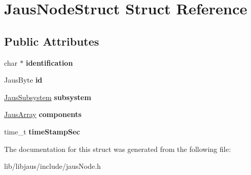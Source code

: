 \hypertarget{struct_jaus_node_struct}{\section{\-Jaus\-Node\-Struct \-Struct \-Reference}
\label{struct_jaus_node_struct}
}
\subsection*{\-Public \-Attributes}
\begin{DoxyCompactItemize}
\item 
\hypertarget{struct_jaus_node_struct_a1bf21d01cc46617f3c91c2bb69a3215b}{char $\ast$ {\bfseries identification}}\label{struct_jaus_node_struct_a1bf21d01cc46617f3c91c2bb69a3215b}

\item 
\hypertarget{struct_jaus_node_struct_a47acd907637669325792e99367c2e308}{\-Jaus\-Byte {\bfseries id}}\label{struct_jaus_node_struct_a47acd907637669325792e99367c2e308}

\item 
\hypertarget{struct_jaus_node_struct_a75f375eadfb4bd59ad9868a903c866c2}{\hyperlink{struct_jaus_subsystem_struct}{\-Jaus\-Subsystem} {\bfseries subsystem}}\label{struct_jaus_node_struct_a75f375eadfb4bd59ad9868a903c866c2}

\item 
\hypertarget{struct_jaus_node_struct_a527ec6fb134981f5adfca5fed2477d0d}{\hyperlink{struct_jaus_array_struct}{\-Jaus\-Array} {\bfseries components}}\label{struct_jaus_node_struct_a527ec6fb134981f5adfca5fed2477d0d}

\item 
\hypertarget{struct_jaus_node_struct_a343a60f3f71c2f507918b040f97480b0}{time\-\_\-t {\bfseries time\-Stamp\-Sec}}\label{struct_jaus_node_struct_a343a60f3f71c2f507918b040f97480b0}

\end{DoxyCompactItemize}


\-The documentation for this struct was generated from the following file\-:\begin{DoxyCompactItemize}
\item 
lib/libjaus/include/jaus\-Node.\-h\end{DoxyCompactItemize}
